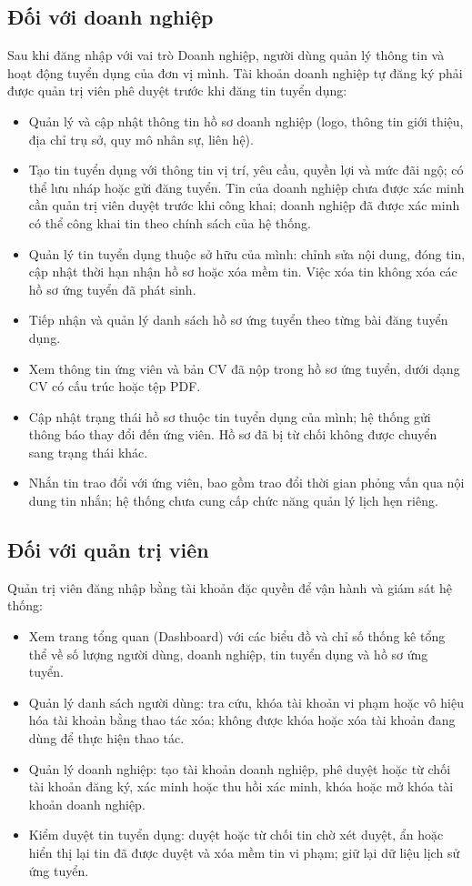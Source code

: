 \subsection{Đối với doanh nghiệp}
Sau khi đăng nhập với vai trò Doanh nghiệp, người dùng quản lý thông tin và hoạt động tuyển dụng của đơn vị mình. Tài khoản doanh nghiệp tự đăng ký phải được quản trị viên phê duyệt trước khi đăng tin tuyển dụng:
\begin{itemize}
    \item Quản lý và cập nhật thông tin hồ sơ doanh nghiệp (logo, thông tin giới thiệu, địa chỉ trụ sở, quy mô nhân sự, liên hệ).
    \item Tạo tin tuyển dụng với thông tin vị trí, yêu cầu, quyền lợi và mức đãi ngộ; có thể lưu nháp hoặc gửi đăng tuyển. Tin của doanh nghiệp chưa được xác minh cần quản trị viên duyệt trước khi công khai; doanh nghiệp đã được xác minh có thể công khai tin theo chính sách của hệ thống.
    \item Quản lý tin tuyển dụng thuộc sở hữu của mình: chỉnh sửa nội dung, đóng tin, cập nhật thời hạn nhận hồ sơ hoặc xóa mềm tin. Việc xóa tin không xóa các hồ sơ ứng tuyển đã phát sinh.
    \item Tiếp nhận và quản lý danh sách hồ sơ ứng tuyển theo từng bài đăng tuyển dụng.
    \item Xem thông tin ứng viên và bản CV đã nộp trong hồ sơ ứng tuyển, dưới dạng CV có cấu trúc hoặc tệp PDF.
    \item Cập nhật trạng thái hồ sơ thuộc tin tuyển dụng của mình; hệ thống gửi thông báo thay đổi đến ứng viên. Hồ sơ đã bị từ chối không được chuyển sang trạng thái khác.
    \item Nhắn tin trao đổi với ứng viên, bao gồm trao đổi thời gian phỏng vấn qua nội dung tin nhắn; hệ thống chưa cung cấp chức năng quản lý lịch hẹn riêng.
\end{itemize}

\subsection{Đối với quản trị viên}
Quản trị viên đăng nhập bằng tài khoản đặc quyền để vận hành và giám sát hệ thống:
\begin{itemize}
    \item Xem trang tổng quan (Dashboard) với các biểu đồ và chỉ số thống kê tổng thể về số lượng người dùng, doanh nghiệp, tin tuyển dụng và hồ sơ ứng tuyển.
    \item Quản lý danh sách người dùng: tra cứu, khóa tài khoản vi phạm hoặc vô hiệu hóa tài khoản bằng thao tác xóa; không được khóa hoặc xóa tài khoản đang dùng để thực hiện thao tác.
    \item Quản lý doanh nghiệp: tạo tài khoản doanh nghiệp, phê duyệt hoặc từ chối tài khoản đăng ký, xác minh hoặc thu hồi xác minh, khóa hoặc mở khóa tài khoản doanh nghiệp.
    \item Kiểm duyệt tin tuyển dụng: duyệt hoặc từ chối tin chờ xét duyệt, ẩn hoặc hiển thị lại tin đã được duyệt và xóa mềm tin vi phạm; giữ lại dữ liệu lịch sử ứng tuyển.
\end{itemize}

